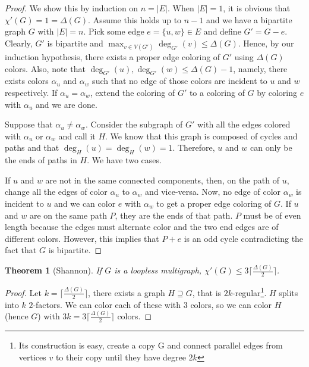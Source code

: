 \documentclass{tufte-handout}
\newtheorem{thm}{Theorem}
\theoremstyle{definition}
\theoremstyle{remark}
\begin{document}
\begin{proof}
	We show this by induction on $n = |E|$. When $|E| = 1$, it is obvious that $\chi'(G) = 1 = \Delta(G)$. Assume this holds up to $n-1$ and we have a bipartite graph $G$ with $|E| = n$. Pick some edge $e = \{u,w\} \in E$ and define $G' = G - e$. Clearly, $G'$ is bipartite and $\max_{v \in V(G')}\deg_{G'}(v) \leq \Delta(G)$. Hence, by our induction hypothesis, there exists a proper edge coloring of $G'$ using $\Delta(G)$ colors. Also, note that $\deg_{G'}(u), \deg_{G'}(w) \leq \Delta(G)-1$, namely, there exists colors $\alpha_u$ and $\alpha_w$ such that no edge of those colors are incident to $u$ and $w$ respectively. If $\alpha_u = \alpha_w$, extend the coloring of $G'$ to a coloring of $G$ by coloring $e$ with $\alpha_u$ and we are done.
	
	Suppose that $\alpha_u \neq \alpha_w$. Consider the subgraph of $G'$ with all the edges colored with $\alpha_u$ or $\alpha_w$ and call it $H$. We know that this graph is composed of cycles and paths and that $\deg_H(u) = \deg_H(w) = 1$. Therefore, $u$ and $w$ can only be the ends of paths in $H$. We have two cases. 
	
	If $u$ and $w$ are not in the same connected components, then, on the path of $u$, change all the edges of color $\alpha_u$ to $\alpha_w$ and vice-versa. Now, no edge of color $\alpha_w$ is incident to $u$ and we can color $e$ with $\alpha_w$ to get a proper edge coloring of $G$. If $u$ and $w$ are on the same path $P$, they are the ends of that path. $P$ must be of even length because the edges must alternate color and the two end edges are of different colors. However, this implies that $P+e$ is an odd cycle contradicting the fact that $G$ is bipartite.
\end{proof}
\begin{thm}[Shannon]
	If $G$ is a loopless multigraph, $\chi'(G) \leq 3 \lceil \frac{\Delta(G)}{2} \rceil$.
\end{thm}
\begin{proof}
	Let $k = \lceil\frac{\Delta(G)}{2} \rceil$, there exists a graph $H \supseteq G$, that is $2k$-regular\footnote{Its construction is easy, create a copy G and connect parallel edges from vertices $v$ to their copy until they have degree $2k$}. $H$ splits into $k$ $2$-factors. We can color each of these with $3$ colors, so we can color $H$ (hence $G$) with $3k = 3\lceil\frac{\Delta(G)}{2} \rceil$ colors.
\end{proof}
\end{document}
